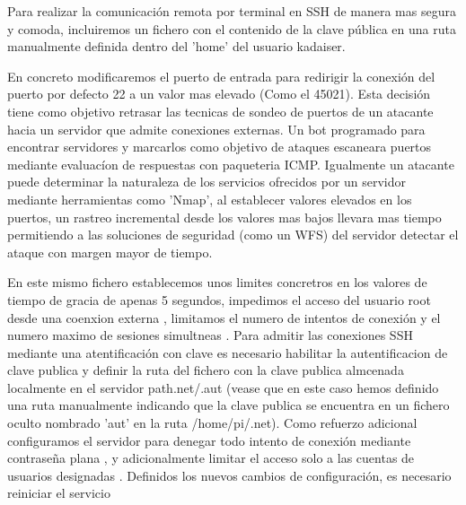 Para realizar la comunicación remota por terminal en SSH de manera mas segura y comoda, incluiremos un fichero con el contenido de la clave pública en una ruta manualmente definida dentro del 'home' del usuario kadaiser.

En concreto modificaremos el puerto de entrada para redirigir la conexión del puerto por defecto 22 a un valor mas elevado (Como el 45021). Esta decisión tiene como objetivo retrasar las tecnicas de sondeo de puertos de un atacante hacia un servidor que admite conexiones externas. Un bot programado para encontrar servidores y marcarlos como objetivo de ataques escaneara puertos mediante evaluacíon de respuestas con paqueteria ICMP. Igualmente un atacante puede determinar la naturaleza de los servicios ofrecidos por un servidor mediante herramientas como 'Nmap', al establecer valores elevados en los puertos, un rastreo incremental desde los valores mas bajos llevara mas tiempo permitiendo a las soluciones de seguridad (como un WFS) del servidor detectar el ataque con margen mayor de tiempo.

En este mismo fichero establecemos unos limites concretros en los valores de tiempo de gracia  de apenas 5 segundos, impedimos el acceso del usuario root desde una coenxion externa , limitamos el numero de intentos de conexión  y el numero maximo de sesiones simultneas . Para admitir las conexiones SSH mediante una atentificación con clave es necesario habilitar la autentificacion de clave publica  y definir la ruta del fichero con la clave publica almcenada localmente en el servidor  path{.net/.aut} (vease que en este caso hemos definido una ruta manualmente indicando que la clave publica se encuentra en un fichero oculto nombrado 'aut' en la ruta /home/pi/.net). Como refuerzo adicional configuramos el servidor para denegar todo intento de conexión mediante contraseña plana  , y adicionalmente limitar el acceso solo a las cuentas de usuarios designadas . Definidos los nuevos cambios de configuración, es necesario reiniciar el servicio
